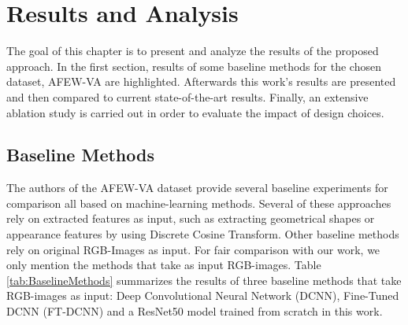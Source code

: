 \chapter{Results and Analysis}\label{chap:Analysis}
The goal of this chapter is to present and analyze the results of the proposed approach. In the first section, results of some baseline methods for the chosen dataset, AFEW-VA are highlighted. Afterwards this work's results are presented and then compared to current state-of-the-art results. Finally, an extensive ablation study is carried out in order to evaluate the impact of design choices.

\section{Baseline Methods}
The authors of the AFEW-VA dataset \citep{Kossaifi:2017:AFEW-VADatabase} provide several baseline experiments for comparison all based on machine-learning methods. Several of these approaches rely on extracted features as input, such as extracting geometrical shapes or appearance features by using Discrete Cosine Transform. Other baseline methods rely on original RGB-Images as input. For fair comparison with our work, we only mention the methods that take as input RGB-images. 
\newline\newline
Table \ref{tab:BaselineMethods} summarizes the results of three baseline methods that take RGB-images as input: Deep Convolutional Neural Network (DCNN), Fine-Tuned DCNN (FT-DCNN) and a ResNet50 model trained from scratch in this work.

